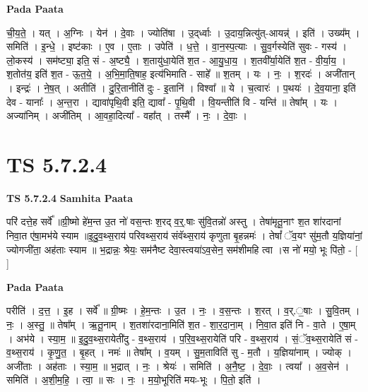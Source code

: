 \documentclass[17pt]{extarticle}
\begin{document}
\textbf{Pada Paata} \newline

ची॒य॒ते॒ । यत् । अ॒ग्निः । येन॑ । दे॒वाः । ज्योति॑षा । उ॒द्‌र्ध्वाः । उ॒दाय॒न्नित्यु॑त्-आयन्न्॑ । इति॑ । उख्य᳚म् । समिति॑ । इ॒न्धे॒ । इष्ट॑काः । ए॒व । ए॒ताः । उपेति॑ । ध॒त्ते॒ । वा॒न॒स्प॒त्याः । सु॒व॒र्गस्येति॑ सुवः - गस्य॑ । लो॒कस्य॑ । सम॑ष्ट्या॒ इति॒ सं - अ॒ष्ट्यै॒ । श॒तायु॑धा॒येति॑ श॒त - आ॒यु॒धा॒य॒ । श॒तवी᳚र्या॒येति॑ श॒त - वी॒र्या॒य॒ । श॒तोत॑य॒ इति॑ श॒त - ऊ॒त॒ये॒ । अ॒भि॒मा॒ति॒षाह॒ इत्य॑भिमाति -   साहे᳚ ॥ श॒तम् । यः । नः॒ । श॒रदः॑ । अजी॑तान् । इन्द्रः॑ । ने॒ष॒त् । अतीति॑ । दु॒रि॒तानीति॑ दुः - इ॒तानि॑ । विश्वा᳚ ॥ ये । च॒त्वारः॑ । प॒थयः॑ । दे॒व॒याना॒ इति॑ देव - यानाः᳚ । अ॒न्त॒रा । द्यावा॑पृथि॒वी इति॒ द्यावा᳚ - पृ॒थि॒वी । वि॒यन्तीति॑ वि - यन्ति॑ ॥ तेषा᳚म् । यः । अज्या॑निम् । अजी॑तिम् । आ॒वहा॒दित्या᳚ - वहा᳚त् । तस्मै᳚ । नः॒ । दे॒वाः॒ ।  \newline




\section*{ TS 5.7.2.4 }

\textbf{TS 5.7.2.4 } \newline
\textbf{Samhita Paata} \newline

परि॑ दत्ते॒ह सर्वे᳚ ॥ग्री॒ष्मो हे॑म॒न्त उ॒त नो॑ वस॒न्तः श॒रद् व॒र्॒.षाः सु॑वि॒तन्नो॑ अस्तु । तेषा॑मृतू॒नाꣳ श॒त शा॑रदानां निवा॒त ए॑षा॒मभ॑ये स्याम ॥इ॒दु॒व॒थ्स॒राय॑ परिवथ्स॒राय॑ संवॅथ्स॒राय॑ कृणुता बृ॒हन्नमः॑ । तेषां᳚ ॅव॒यꣳ सु॑म॒तौ य॒ज्ञिया॑नां॒ ज्योगजी॑ता॒ अह॑ताः स्याम ॥ भ॒द्रान्नः॒ श्रेयः॒ सम॑नैष्ट देवा॒स्त्वया॑ऽव॒सेन॒ सम॑शीमहि त्वा ।स नो॑ मयो॒ भूः पि॑तो॒ - [  ] \newline

\textbf{Pada Paata} \newline

परीति॑ । द॒त्त॒ । इ॒ह । सर्वे᳚ ॥ ग्री॒ष्मः । हे॒म॒न्तः । उ॒त । नः॒ । व॒स॒न्तः । श॒रत् । व॒र्.॒षाः । सु॒वि॒तम् । नः॒ । अ॒स्तु॒ ॥ तेषा᳚म् । ऋ॒तू॒नाम् । श॒तशा॑रदाना॒मिति॑ श॒त - शा॒र॒दा॒ना॒म् । नि॒वा॒त इति॑ नि - वा॒ते । ए॒षा॒म् । अभ॑ये । स्या॒म॒ ॥ इ॒दु॒व॒थ्स॒रायेती॑दु - व॒थ्स॒राय॑ । प॒रि॒व॒थ्स॒रायेति॑ परि - व॒थ्स॒राय॑ । सं॒ॅव॒थ्स॒रायेति॑ सं - व॒थ्स॒राय॑ । कृ॒णु॒त॒ । बृ॒हत् । नमः॑ ॥ तेषा᳚म् । व॒यम् । सु॒म॒ताविति॑ सु - म॒तौ । य॒ज्ञिया॑नाम् । ज्योक् । अजी॑ताः । अह॑ताः । स्या॒म॒ ॥ भ॒द्रात् । नः॒ । श्रेयः॑ । समिति॑ । अ॒नै॒ष्ट॒ । दे॒वाः॒ । त्वया᳚ । अ॒व॒सेन॑ । समिति॑ । अ॒शी॒म॒हि॒ । त्वा॒ ॥ सः । नः॒ । म॒यो॒भूरिति॑ मयः-भूः । पि॒तो॒ इति॑ ।  \newline
\end{document}
